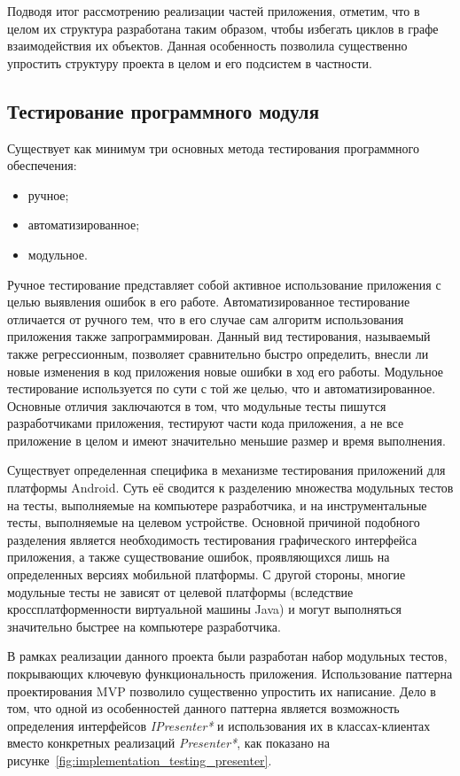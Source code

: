 Подводя итог рассмотрению реализации частей приложения, отметим,
что в целом их структура разработана таким образом,
чтобы избегать циклов в графе взаимодействия их объектов.
Данная особенность позволила существенно упростить
структуру проекта в целом и его подсистем в частности.

\subsection{Тестирование программного модуля}

Существует как минимум три основных метода тестирования
программного обеспечения:
\begin{itemize}
\item ручное;
\item автоматизированное;
\item модульное.
\end{itemize}

Ручное тестирование представляет собой активное использование приложения
с целью выявления ошибок в его работе.
Автоматизированное тестирование отличается от ручного тем,
что в его случае сам алгоритм использования приложения также запрограммирован.
Данный вид тестирования, называемый также регрессионным,
позволяет сравнительно быстро определить,
внесли ли новые изменения в код приложения новые ошибки в ход его работы.
Модульное тестирование используется по сути с той же целью,
что и автоматизированное. Основные отличия заключаются в том,
что модульные тесты пишутся разработчиками приложения,
тестируют части кода приложения, а не все приложение в целом
и имеют значительно меньшие размер и время выполнения.

Существует определенная специфика в механизме тестирования приложений
для платформы Android. Суть её сводится к разделению множества модульных тестов
на тесты, выполняемые на компьютере разработчика, и на инструментальные тесты,
выполняемые на целевом устройстве.
Основной причиной подобного разделения является необходимость тестирования
графического интерфейса приложения, а также существование ошибок,
проявляющихся лишь на определенных версиях мобильной платформы.
С другой стороны, многие модульные тесты не зависят от
целевой платформы (вследствие кроссплатформенности виртуальной машины Java)
и могут выполняться значительно быстрее на компьютере разработчика.

В рамках реализации данного проекта были разработан набор модульных тестов,
покрывающих ключевую функциональность приложения.
Использование паттерна проектирования MVP позволило существенно упростить их написание.
Дело в том, что одной из особенностей данного паттерна является возможность
определения интерфейсов \textit{IPresenter*} и использования
их в классах-клиентах вместо конкретных реализаций \textit{Presenter*},
как показано на рисунке~\ref{fig:implementation_testing_presenter}.


